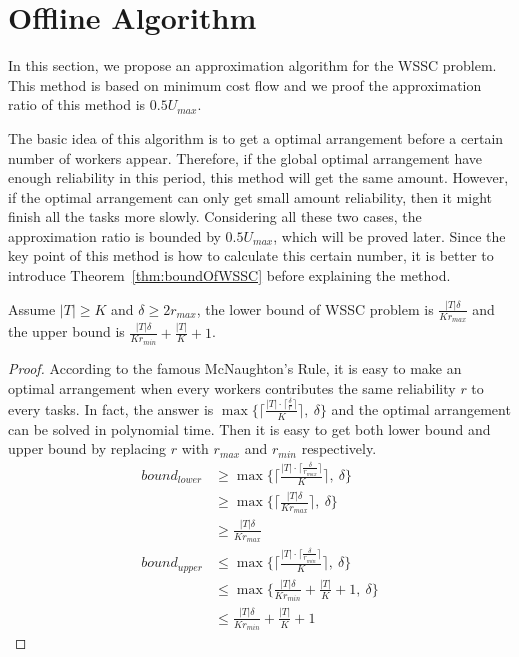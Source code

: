 \section{Offline Algorithm}
\label{sec:offline}
In this section, we propose an approximation algorithm for the WSSC problem.
This method is based on minimum cost flow and we proof the approximation ratio of this method is $0.5U_{max}$.

The basic idea of this algorithm is to get a optimal arrangement before a certain number of workers appear.
Therefore, if the global optimal arrangement have enough reliability in this period, this method will get the same amount.
However, if the optimal arrangement can only get small amount reliability, then it might finish all the tasks more slowly.
Considering all these two cases, the approximation ratio is bounded by $0.5U_{max}$, which will be proved later.
Since the key point of this method is how to calculate this certain number, it is better to introduce Theorem~\ref{thm:boundOfWSSC} before 
explaining the method.

\begin{theorem}
\label{thm:boundOfWSSC}
Assume $|T| \ge K$ and $\delta \ge 2r_{max}$,
the lower bound of WSSC problem is $\frac{|T|\delta}{Kr_{max}}$ and the upper bound is $\frac{|T|\delta}{Kr_{min}} + \frac{|T|}{K} + 1$.
\end{theorem}

\begin{proof}
According to the famous McNaughton's Rule\cite{NaughtonRule}, it is easy to make an optimal arrangement when every workers contributes the same reliability $r$ to every tasks.
In fact, the answer is $\max\{\lceil \frac{|T| \cdot \lceil \frac{\delta}{r} \rceil}{K} \rceil,\ \delta\}$ and the optimal arrangement can be solved in polynomial time.
Then it is easy to get both lower bound and upper bound by replacing $r$ with $r_{max}$ and $r_{min}$ respectively.
\begin{align*}
	bound_{lower} &\ge \max\{\lceil \frac{|T| \cdot \lceil \frac{\delta}{r_{max}} \rceil}{K} \rceil,\ \delta\} \\
					&\ge \max\{\lceil \frac{|T|\delta}{Kr_{max}} \rceil,\ \delta \} \\
					&\ge \frac{|T|\delta}{Kr_{max}}  \\
	bound_{upper} &\le \max\{\lceil \frac{|T| \cdot \lceil \frac{\delta}{r_{min}} \rceil}{K} \rceil,\ \delta\} \\
					&\le \max\{ \frac{|T|\delta}{Kr_{min}} + \frac{|T|}{K} + 1,\ \delta \} \\
					&\le \frac{|T|\delta}{Kr_{min}} + \frac{|T|}{K} + 1
\end{align*}
\end{proof}

